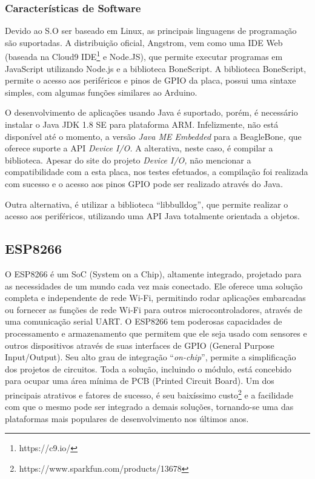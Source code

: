 \subsubsection{Características de Software}

Devido ao S.O ser baseado em Linux, as principais linguagens de programação
são suportadas. A distribuição oficial, Angstrom, vem como uma IDE
Web (baseada na Cloud9 IDE\footnote{https://c9.io/} e Node.JS), que
permite executar programas em JavaScript utilizando Node.js e a biblioteca
BoneScript. A biblioteca BoneScript, permite o acesso aos periféricos
e pinos de GPIO da placa, possui uma sintaxe simples, com algumas
funções similares ao Arduino.

O desenvolvimento de aplicações usando Java é suportado, porém, é
necessário instalar o Java JDK 1.8 SE para plataforma ARM. Infelizmente,
não está disponível até o momento, a versão \emph{Java ME Embedded
}para a BeagleBone\emph{, }que oferece suporte a API \emph{Device
I/O.} A alterativa, neste caso, é compilar a biblioteca. Apesar do
site do projeto \emph{Device I/O,} não mencionar a compatibilidade
com a esta placa, nos testes efetuados, a compilação foi realizada
com sucesso e o acesso aos pinos GPIO pode ser realizado através do
Java\emph{.}

Outra alternativa, é utilizar a biblioteca ``libbulldog''\cite{beagleboard:libbulldog},
que permite realizar o acesso aos periféricos, utilizando uma API
Java totalmente orientada a objetos.


\subsection{ESP8266}

O ESP8266\cite{url:esp8266:espressif}\cite{esp8266:datasheet} é
um SoC (System on a Chip), altamente integrado, projetado para as
necessidades de um mundo cada vez mais conectado. Ele oferece uma
solução completa e independente de rede Wi-Fi, permitindo rodar aplicações
embarcadas ou fornecer as funções de rede Wi-Fi para outros microcontroladores,
através de uma comunicação serial UART. O ESP8266 tem poderosas capacidades
de processamento e armazenamento que permitem que ele seja usado com
sensores e outros dispositivos através de suas interfaces de GPIO
(General Purpose Input/Output). Seu alto grau de integração ``\emph{on-chip}'',
permite a simplificação dos projetos de circuitos. Toda a solução,
incluindo o módulo, está concebido para ocupar uma área mínima de
PCB (Printed Circuit Board). Um dos principais atrativos e fatores
de sucesso, é seu baixíssimo custo\footnote{https://www.sparkfun.com/products/13678}
e a facilidade com que o mesmo pode ser integrado a demais soluções,
tornando-se uma das plataformas mais populares de desenvolvimento
nos últimos anos.

